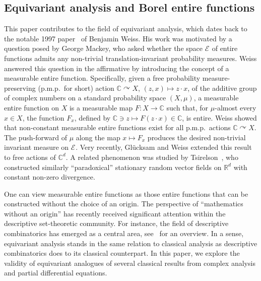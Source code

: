 \documentclass[12pt]{paper}
\numberwithin{equation}{section}
\theoremstyle{plain}
\theoremstyle{definition}
\newcommand{\C}{\mathbb{C}}
\newcommand{\Rd}{\mathbb{R}^{d}}
\newcommand{\holom}[1][]{\mathcal{E}_{#1}}
\newcommand{\acts}{\curvearrowright}
\newcommand{\say}[1]{``#1''}
\begin{document}
\subsection{Equivariant analysis and Borel entire functions}
\label{sec:what-is-equivariant-analysis}
This paper contributes to the field of equivariant analysis, which dates back to the notable 1997
paper~\cite{MR1422707} of Benjamin Weiss. His work was motivated by a question posed by George
Mackey, who asked whether the space \(\holom\) of entire functions admits any non-trivial
translation-invariant probability measures.  Weiss answered this question in the affirmative by
introducing the concept of a measurable entire function.  Specifically, given a free probability
measure-preserving (p.m.p.\ for short) action \(\C \acts X\), \((z,x)\mapsto z\cdot x\), of the
additive group of complex numbers on a standard probability space \((X, \mu)\), a measurable entire
function on \(X\) is a measurable map \(F : X \to \C\) such that, for \(\mu\)-almost every
\(x \in X\), the function \(F_{x}\), defined by \(\C\ni z \mapsto F(z\cdot x)\in \C\), is entire.
Weiss showed that non-constant measurable entire functions exist for all p.m.p.\ actions
\(\C \acts X\).  The push-forward of \(\mu\) along the map \(x \mapsto F_{x}\) produces the desired
non-trivial invariant measure on \(\holom\). Very recently, Glücksam and Weiss \cite{GlucksamWeiss}
extended this result to free actions of \(\C^d\). A related phenomenon was studied by
Tsirelson~\cite{tsirelson2007}, who constructed similarly \say{paradoxical} stationary random vector
fields on \(\Rd\) with constant non-zero divergence.

One can view measurable entire functions as those entire functions that can be constructed without
the choice of an origin. The perspective of ``mathematics without an origin'' has recently received
significant attention within the descriptive set-theoretic community.  For instance, the field of
descriptive combinatorics has emerged as a central area, see~\cite{KechrisMarks} for an overview.
In a sense, equivariant analysis stands in the same relation to classical analysis as descriptive
combinatorics does to its classical counterpart.  In this paper, we explore the validity of
equivariant analogues of several classical results from complex analysis and partial differential
equations.
\end{document}
